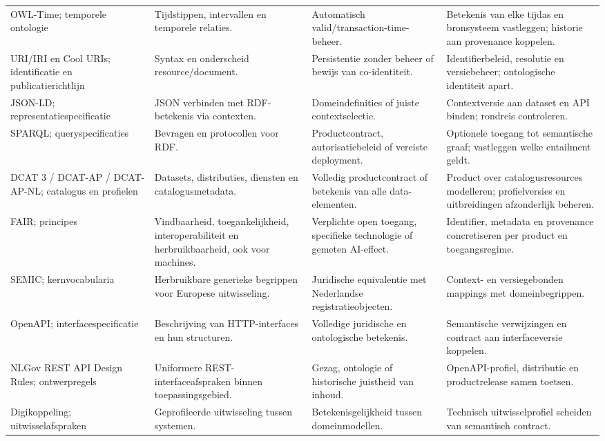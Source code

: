 \begin{longtable}{@{}P{.22\linewidth}P{.22\linewidth}P{.24\linewidth}P{.24\linewidth}@{}}
OWL-Time; temporele ontologie \citep{S37} & Tijdstippen, intervallen en temporele relaties. & Automatisch valid/transaction-time-beheer. & Betekenis van elke tijdas en bronsysteem vastleggen; historie aan provenance koppelen. \\
URI/IRI en Cool URIs; identificatie en publicatierichtlijn \citep{S38,S39} & Syntax en onderscheid resource/document. & Persistentie zonder beheer of bewijs van co-identiteit. & Identifierbeleid, resolutie en versiebeheer; ontologische identiteit apart. \\
JSON-LD; representatie\-specificatie \citep{S35} & JSON verbinden met RDF-betekenis via contexten. & Domeindefinities of juiste contextselectie. & Contextversie aan dataset en API binden; rondreis controleren. \\
SPARQL; queryspecificaties \citep{S36} & Bevragen en protocollen voor RDF. & Productcontract, autorisatiebeleid of vereiste deployment. & Optionele toegang tot semantische graaf; vastleggen welke entailment geldt. \\
DCAT 3 / DCAT-AP / DCAT-AP-NL; catalogus en profielen \citep{S47,S45,S16} & Datasets, distributies, diensten en catalogusmetadata. & Volledig productcontract of betekenis van alle data-elementen. & Product over catalogusresources modelleren; profielversies en uitbreidingen afzonderlijk beheren. \\
FAIR; principes \citep{L11} & Vindbaarheid, toegankelijkheid, interoperabiliteit en herbruikbaarheid, ook voor machines. & Verplichte open toegang, specifieke technologie of gemeten AI-effect. & Identifier, metadata en provenance concretiseren per product en toegangsregime. \\
SEMIC; kernvocabularia \citep{S44} & Herbruikbare generieke begrippen voor Europese uitwisseling. & Juridische equivalentie met Nederlandse registratieobjecten. & Context- en versiegebonden mappings met domeinbegrippen. \\
OpenAPI; interface\-specificatie \citep{S19} & Beschrijving van HTTP-interfaces en hun structuren. & Volledige juridische en ontologische betekenis. & Semantische verwijzingen en contract aan interfaceversie koppelen. \\
NLGov REST API Design Rules; ontwerpregels \citep{S18} & Uniformere REST-interfaceafspraken binnen toepassingsgebied. & Gezag, ontologie of historische juistheid van inhoud. & OpenAPI-profiel, distributie en productrelease samen toetsen. \\
Digikoppeling; uitwissel\-afspraken \citep{S20} & Geprofileerde uitwisseling tussen systemen. & Betekenisgelijkheid tussen domeinmodellen. & Technisch uitwisselprofiel scheiden van semantisch contract. \\

\end{longtable}
